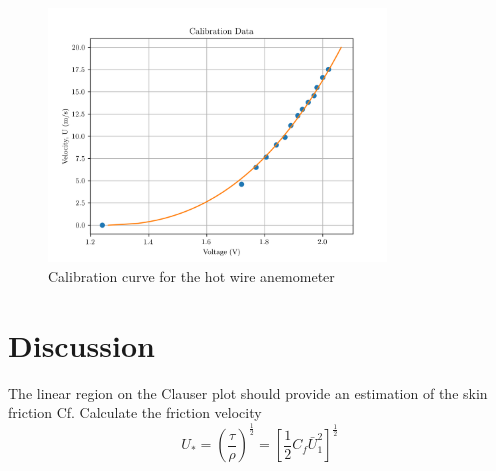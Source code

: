 \documentclass{article}
\begin{document}
\begin{figure}[H]
    \centering
    \includegraphics[width=0.8\textwidth]{calibration.png}
    \caption{Calibration curve for the hot wire anemometer}
    \label{fig:calibration}
\end{figure}







\section{Discussion}







The linear region on the Clauser plot should provide an estimation of the skin friction Cf.
Calculate the friction velocity
\begin{equation}
    U_* = \left( \frac{\tau}{\rho} \right)^{\frac{1}{2}} = \left[ \frac{1}{2}C_f \bar{ U}_1^2 \right]^{\frac{1}{2}}
\end{equation}
\end{document}
